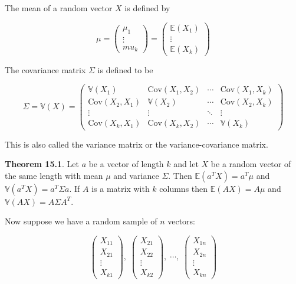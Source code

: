 The mean of a random vector \(X\) is defined by

\[\mu 
= \begin{pmatrix} \mu_{1} \\ \vdots \\ mu_{k} \end{pmatrix} 
= \begin{pmatrix} \mathbb{E}(X_{1}) \\ \vdots \\ \mathbb{E}(X_{k}) \end{pmatrix}
\]

The covariance matrix \(\Sigma\) is defined to be

\[\Sigma = \mathbb{V}(X) = \begin{pmatrix}
\mathbb{V}(X_{1}) & \text{Cov}(X_{1}, X_{2}) & \cdots & \text{Cov}(X_{1}, X_{k}) \\
\text{Cov}(X_{2}, X_{1}) & \mathbb{V}(X_{2}) & \cdots & \text{Cov}(X_{2}, X_{k}) \\
\vdots & \vdots & \ddots & \vdots \\
\text{Cov}(X_{k}, X_{1}) & \text{Cov}(X_{k}, X_{2}) & \cdots & \mathbb{V}(X_{k})
\end{pmatrix}\]

This is also called the variance matrix or the variance-covariance
matrix.

\textbf{Theorem 15.1}. Let \(a\) be a vector of length \(k\) and let
\(X\) be a random vector of the same length with mean \(\mu\) and
variance \(\Sigma\). Then \(\mathbb{E}(a^T X) = a^T\mu\) and
\(\mathbb{V}(a^T X) = a^T \Sigma a\). If \(A\) is a matrix with \(k\)
columns then \(\mathbb{E}(AX) = A\mu\) and
\(\mathbb{V}(AX) = A \Sigma A^T\).

Now suppose we have a random sample of \(n\) vectors:

\[
\begin{pmatrix}X_{11} \\ X_{21} \\ \vdots \\ X_{k1} \end{pmatrix}, \;
\begin{pmatrix}X_{21} \\ X_{22} \\ \vdots \\ X_{k2} \end{pmatrix}, \;
\cdots , \;
\begin{pmatrix}X_{1n} \\ X_{2n} \\ \vdots \\ X_{kn} \end{pmatrix}
\]

